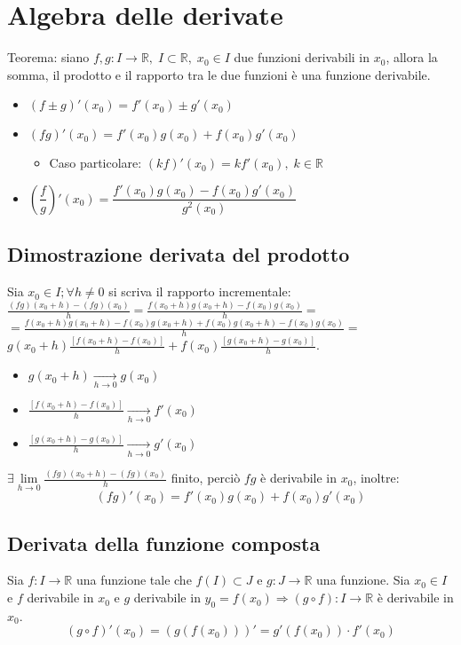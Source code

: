 \chapter{Algebra delle derivate}
Teorema: siano $f, g:I\rightarrow\mathbb{R}, \; I\subset\mathbb{R},\; x_0\in I$ due funzioni derivabili in $x_0$, allora la somma, il prodotto e il rapporto tra le due 
funzioni \`e una funzione derivabile.
\begin{itemize}
\item $(f\pm g)'(x_0)=f'(x_0)\pm g'(x_0)$
\item $(fg)'(x_0)=f'(x_0)g(x_0)+ f(x_0)g'(x_0)$
\begin{itemize}
\item Caso particolare: $(kf)'(x_0)=kf'(x_0),\;k\in\mathbb{R}$
\end{itemize}
\item $(\dfrac{f}{g})'(x_0)=\dfrac{f'(x_0)g(x_0)-f(x_0)g'(x_0)}{g^2(x_0)}$
\end{itemize}
\section{Dimostrazione derivata del prodotto}
Sia $x_0\in I;\forall h\neq 0$ si scriva il rapporto incrementale: $\frac{(fg)(x_0+h)-(fg)(x_0)}{h}=\frac{f(x_0+h)g(x_0+h)-f(x_0)g(x_0)}{h}=$\\
$=\frac{f(x_0+h)g(x_0+h)-f(x_0)g(x_0+h)+f(x_0)g(x_0+h)-f(x_0)g(x_0)}{h}=$\\
$g(x_0+h)\frac{[f(x_0+h)-f(x_0)]}{h}+f(x_0)\frac{[g(x_0+h)-g(x_0)]}{h}$.
\begin{itemize}
\item $g(x_0+h)\xrightarrow[h\rightarrow 0]{}g(x_0)$\\
\item $\frac{[f(x_0+h)-f(x_0)]}{h}\xrightarrow[h\rightarrow 0]{}f'(x_0)$\\
\item $\frac{[g(x_0+h)-g(x_0)]}{h}\xrightarrow[h\rightarrow 0]{}g'(x_0)$\\
\end{itemize}
$\exists\lim\limits_{h\rightarrow 0}\frac{(fg)(x_0+h)-(fg)(x_0)}{h}$ finito, perci\`o $fg$ \`e derivabile in $x_0$, inoltre:
\begin{equation}
(fg)'(x_0)=f'(x_0)g(x_0)+ f(x_0)g'(x_0)
\end{equation}
\section{Derivata della funzione composta}
Sia $f:I\rightarrow\mathbb{R}$ una funzione tale che $f(I)\subset J$ e $g:J\rightarrow\mathbb{R}$ una funzione. Sia $x_0\in I$ e $f$ derivabile in $x_0$ e $g$ derivabile in 
$y_0=f(x_0)\Rightarrow (g\circ f):I\rightarrow\mathbb{R}$ \`e derivabile in $x_0$.
\begin{equation}
(g\circ f)'(x_0)=(g(f(x_0)))'=g'(f(x_0))\cdot f'(x_0)
\end{equation}
